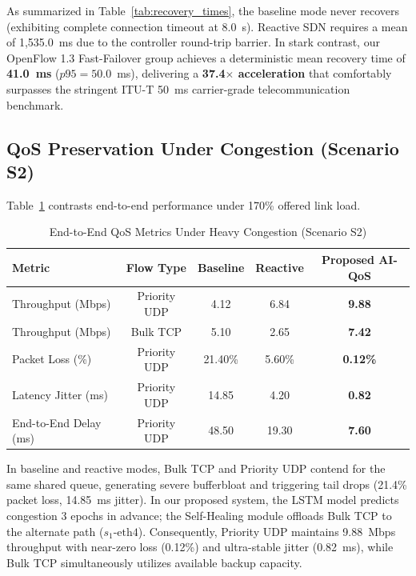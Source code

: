 \documentclass[conference]{IEEEtran}
\begin{document}
As summarized in Table~\ref{tab:recovery_times}, the baseline mode never recovers (exhibiting complete connection timeout at 8.0~s). Reactive SDN requires a mean of 1,535.0~ms due to the controller round-trip barrier. In stark contrast, our OpenFlow 1.3 Fast-Failover group achieves a deterministic mean recovery time of \textbf{41.0~ms} ($p95 = 50.0$~ms), delivering a \textbf{37.4$\times$ acceleration} that comfortably surpasses the stringent ITU-T 50~ms carrier-grade telecommunication benchmark.

\subsection{QoS Preservation Under Congestion (Scenario S2)}
Table~\ref{tab:qos_summary} contrasts end-to-end performance under 170\% offered link load.

\begin{table}[htbp]
\caption{End-to-End QoS Metrics Under Heavy Congestion (Scenario S2)}
\begin{center}
\begin{tabular}{lcccc}
\toprule
\textbf{Metric} & \textbf{Flow Type} & \textbf{Baseline} & \textbf{Reactive} & \textbf{Proposed AI-QoS} \\
\midrule
Throughput (Mbps) & Priority UDP & 4.12 & 6.84 & \textbf{9.88} \\
Throughput (Mbps) & Bulk TCP & 5.10 & 2.65 & \textbf{7.42} \\
Packet Loss (\%) & Priority UDP & 21.40\% & 5.60\% & \textbf{0.12\%} \\
Latency Jitter (ms) & Priority UDP & 14.85 & 4.20 & \textbf{0.82} \\
End-to-End Delay (ms) & Priority UDP & 48.50 & 19.30 & \textbf{7.60} \\
\bottomrule
\end{tabular}
\label{tab:qos_summary}
\end{center}
\end{table}

In baseline and reactive modes, Bulk TCP and Priority UDP contend for the same shared queue, generating severe bufferbloat and triggering tail drops (21.4\% packet loss, 14.85~ms jitter). In our proposed system, the LSTM model predicts congestion 3 epochs in advance; the Self-Healing module offloads Bulk TCP to the alternate path ($s_1\text{-eth4}$). Consequently, Priority UDP maintains 9.88~Mbps throughput with near-zero loss (0.12\%) and ultra-stable jitter (0.82~ms), while Bulk TCP simultaneously utilizes available backup capacity.
\end{document}
